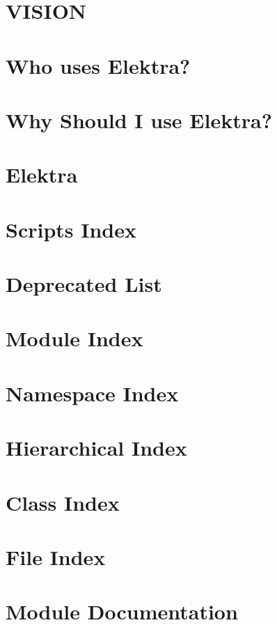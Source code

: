 \let\mypdfximage\pdfximage\def\pdfximage{\immediate\mypdfximage}\documentclass[twoside]{book}
\newcommand{\+}{\discretionary{\mbox{\scriptsize$\hookleftarrow$}}{}{}}
\begin{document}
\chapter{VISION}
\label{doc_VISION_md}

\chapter{Who uses Elektra?}
\label{doc_WHO_md}

\chapter{Why Should I use Elektra?}
\label{doc_WHY_md}

\chapter{Elektra}
\label{README_md}

\chapter{Scripts Index}
\label{scripts_README_md}

\chapter{Deprecated List}
\label{deprecated}

\chapter{Module Index}

\chapter{Namespace Index}

\chapter{Hierarchical Index}

\chapter{Class Index}

\chapter{File Index}

\chapter{Module Documentation}














\end{document}
